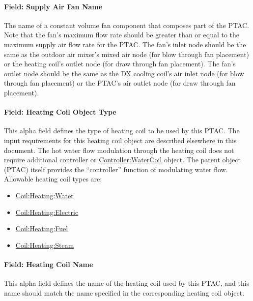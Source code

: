 \paragraph{Field: Supply Air Fan Name}\label{field-supply-air-fan-name-4}

The name of a constant volume fan component that composes part of the PTAC. Note that the fan's maximum flow rate should be greater than or equal to the maximum supply air flow rate for the PTAC. The fan's inlet node should be the same as the outdoor air mixer's mixed air node (for blow through fan placement) or the heating coil's outlet node (for draw through fan placement). The fan's outlet node should be the same as the DX cooling coil's air inlet node (for blow through fan placement) or the PTAC's air outlet node (for draw through fan placement).

\paragraph{Field: Heating Coil Object Type}\label{field-heating-coil-object-type-3-000}

This alpha field defines the type of heating coil to be used by this PTAC. The input requirements for this heating coil object are described elsewhere in this document. The hot water flow modulation through the heating coil does not require additional controller or \hyperref[controllerwatercoil]{Controller:WaterCoil} object. The parent object (PTAC) itself provides the ``controller'' function of modulating water flow. Allowable heating coil types are:

\begin{itemize}
\item
  \hyperref[coilheatingwater]{Coil:Heating:Water}
\item
  \hyperref[coilheatingelectric]{Coil:Heating:Electric}
\item
  \hyperref[coilheatinggas-000]{Coil:Heating:Fuel}
\item
  \hyperref[coilheatingsteam]{Coil:Heating:Steam}
\end{itemize}

\paragraph{Field: Heating Coil Name}\label{field-heating-coil-name-3-000}

This alpha field defines the name of the heating coil used by this PTAC, and this name should match the name specified in the corresponding heating coil object.

